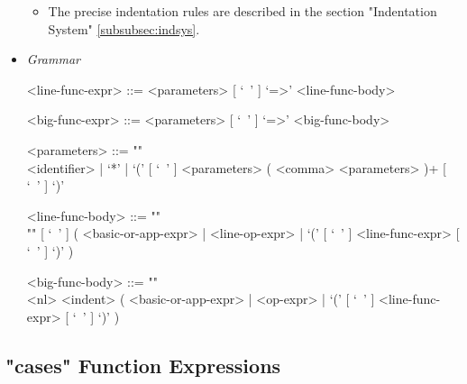 \documentclass[diploma]{softlab-thesis}
\begin{document}
\begin{itemize}
\begin{itemize}
\item
The precise indentation rules are described in the section
"Indentation System" \ref{subsubsec:indsys}.
\end{itemize}

\newpage
\item \textit{Grammar}
\begin{grammar}
<line-func-expr> ::= <parameters> [ `\ ' ] `=>' <line-func-body>

<big-func-expr> ::= <parameters> [ `\ ' ] `=>' <big-func-body>

<parameters> ::= ""\\
<identifier> | `*' |
`(' [ `\ ' ] <parameters> ( <comma> <parameters> )+ [ `\ ' ] `)'

<line-func-body> ::= ""\\""
[ `\ ' ]
(
<basic-or-app-expr> | <line-op-expr> |
`(' [ `\ ' ] <line-func-expr> [ `\ ' ] `)'
)

<big-func-body> ::= ""\\
<nl> <indent>
(
<basic-or-app-expr> | <op-expr> | `(' [ `\ ' ] <line-func-expr> [ `\ ' ] `)'
)
\end{grammar}
\end{itemize}

\newpage
\subsection{"cases" Function Expressions}
\label{subsubsec:casessyntax}
\end{document}
